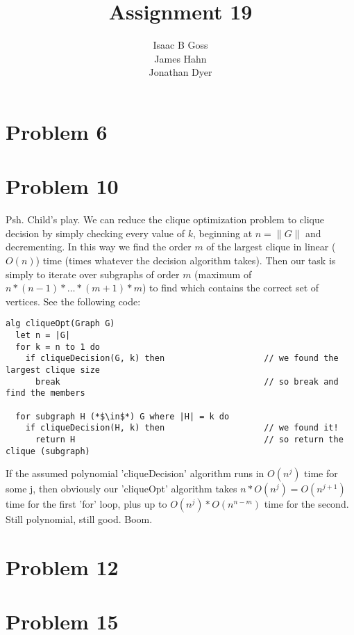 \documentclass{article}
\author{Isaac B Goss\\ James Hahn\\ Jonathan Dyer}
\title{Assignment 19}
\providecommand{\prob}[1]{\section*{Problem #1}}
\begin{document}
\maketitle
\prob{6}




\prob{10}
Psh. Child's play. We can reduce the clique optimization problem to clique decision by simply checking every value of $k$, beginning at $n = \|G\|$ and decrementing. In this way we find the order $m$ of the largest clique in linear ($O\left(n\right)$) time (times whatever the decision algorithm takes). Then our task is simply to iterate over subgraphs of order $m$ (maximum of $n*\left(n-1\right)*\dots*\left(m+1\right)*m$) to find which contains the correct set of vertices. See the following code:\par
\begin{lstlisting}
alg cliqueOpt(Graph G)
  let n = |G|
  for k = n to 1 do
    if cliqueDecision(G, k) then                    // we found the largest clique size
      break                                         // so break and find the members

  for subgraph H (*$\in$*) G where |H| = k do
    if cliqueDecision(H, k) then                    // we found it!
      return H                                      // so return the clique (subgraph)
\end{lstlisting}
If the assumed polynomial 'cliqueDecision' algorithm runs in $O\left(n^j\right)$ time for some j, then obviously our 'cliqueOpt' algorithm takes $n*O\left(n^j\right) = O\left(n^{j+1}\right)$ time for the first 'for' loop, plus up to $O\left(n^j\right) * O\left(n^{n-m}\right)$ time for the second. Still polynomial, still good. Boom.

\prob{12}



\prob{15}
\end{document}
